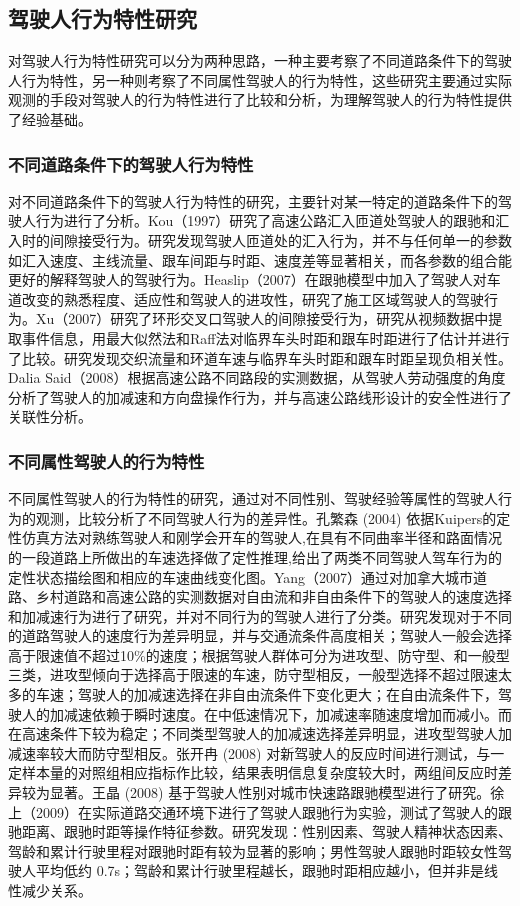 \subsection{驾驶人行为特性研究}
对驾驶人行为特性研究可以分为两种思路，一种主要考察了不同道路条件下的驾驶人行为特性，另一种则考察了不同属性驾驶人的行为特性，这些研究主要通过实际观测的手段对驾驶人的行为特性进行了比较和分析，为理解驾驶人的行为特性提供了经验基础。

\subsubsection{不同道路条件下的驾驶人行为特性}
对不同道路条件下的驾驶人行为特性的研究，主要针对某一特定的道路条件下的驾驶人行为进行了分析。Kou（1997）研究了高速公路汇入匝道处驾驶人的跟驰和汇入时的间隙接受行为。研究发现驾驶人匝道处的汇入行为，并不与任何单一的参数如汇入速度、主线流量、跟车间距与时距、速度差等显著相关，而各参数的组合能更好的解释驾驶人的驾驶行为\cite{Kou1997}。Heaslip（2007）在跟驰模型中加入了驾驶人对车道改变的熟悉程度、适应性和驾驶人的进攻性，研究了施工区域驾驶人的驾驶行为\cite{Heaslip2007}。Xu（2007）研究了环形交叉口驾驶人的间隙接受行为，研究从视频数据中提取事件信息，用最大似然法和Raff法对临界车头时距和跟车时距进行了估计并进行了比较。研究发现交织流量和环道车速与临界车头时距和跟车时距呈现负相关性\cite{Xu2007}。Dalia Said（2008）根据高速公路不同路段的实测数据，从驾驶人劳动强度的角度分析了驾驶人的加减速和方向盘操作行为，并与高速公路线形设计的安全性进行了关联性分析\cite{Said2008}。

\subsubsection{不同属性驾驶人的行为特性}
不同属性驾驶人的行为特性的研究，通过对不同性别、驾驶经验等属性的驾驶人行为的观测，比较分析了不同驾驶人行为的差异性。孔繁森 (2004) 依据Kuipers的定性仿真方法对熟练驾驶人和刚学会开车的驾驶人,在具有不同曲率半径和路面情况的一段道路上所做出的车速选择做了定性推理,给出了两类不同驾驶人驾车行为的定性状态描绘图和相应的车速曲线变化图\cite{孔繁森2004}。Yang（2007）通过对加拿大城市道路、乡村道路和高速公路的实测数据对自由流和非自由条件下的驾驶人的速度选择和加减速行为进行了研究，并对不同行为的驾驶人进行了分类。研究发现对于不同的道路驾驶人的速度行为差异明显，并与交通流条件高度相关；驾驶人一般会选择高于限速值不超过10\%的速度；根据驾驶人群体可分为进攻型、防守型、和一般型三类，进攻型倾向于选择高于限速的车速，防守型相反，一般型选择不超过限速太多的车速；驾驶人的加减速选择在非自由流条件下变化更大；在自由流条件下，驾驶人的加减速依赖于瞬时速度。在中低速情况下，加减速率随速度增加而减小。而在高速条件下较为稳定；不同类型驾驶人的加减速选择差异明显，进攻型驾驶人加减速率较大而防守型相反\cite{Yang2008}。张开冉 (2008) 对新驾驶人的反应时间进行测试，与一定样本量的对照组相应指标作比较，结果表明信息复杂度较大时，两组间反应时差异较为显著\cite{张开冉2008}。王晶 (2008) 基于驾驶人性别对城市快速路跟驰模型进行了研究\cite{王晶2008}。徐上（2009）在实际道路交通环境下进行了驾驶人跟驰行为实验，测试了驾驶人的跟驰距离、跟驰时距等操作特征参数。研究发现：性别因素、驾驶人精神状态因素、驾龄和累计行驶里程对跟驰时距有较为显著的影响；男性驾驶人跟驰时距较女性驾驶人平均低约 0.7s；驾龄和累计行驶里程越长，跟驰时距相应越小，但并非是线性减少关系\cite{徐上2009}。

